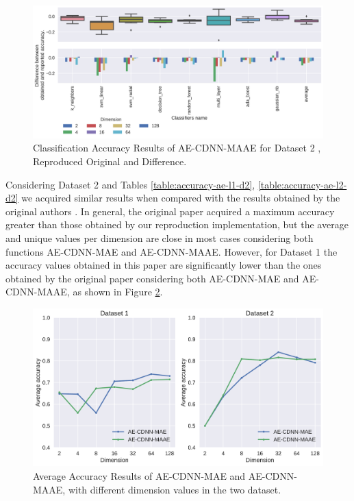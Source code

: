 \begin{figure}[!ht]
    \centering
    \includegraphics[width=\linewidth]{figure/table_5.pdf}
    \caption{Classification Accuracy Results of AE-CDNN-MAAE for Dataset 2 \cite{WenZha:2018}, Reproduced Original and Difference.}
\label{fig:acc-AE-CDNN-MAAE-d2}
\end{figure}


\newpage

Considering Dataset 2 and Tables \ref{table:accuracy-ae-l1-d2}, \ref{table:accuracy-ae-l2-d2} we acquired similar results when compared with the results obtained by the original authors \cite{WenZha:2018}. In general, the original paper acquired a maximum accuracy greater than those obtained by our reproduction implementation, but the average and unique values per dimension are close in most cases considering both functions AE-CDNN-MAE and AE-CDNN-MAAE. However, for Dataset 1 the accuracy values obtained in this paper are significantly lower than the ones obtained by the original paper considering both AE-CDNN-MAE and AE-CDNN-MAAE, as shown in Figure \ref{fig:average}. 

\newpage


\begin{figure}[!ht]
\centering
\includegraphics[width=0.8\linewidth]{figure/average.pdf}
    \caption{Average Accuracy Results of AE-CDNN-MAE and AE-CDNN-MAAE, with different dimension values in the two dataset.}
\label{fig:average}
\end{figure}

